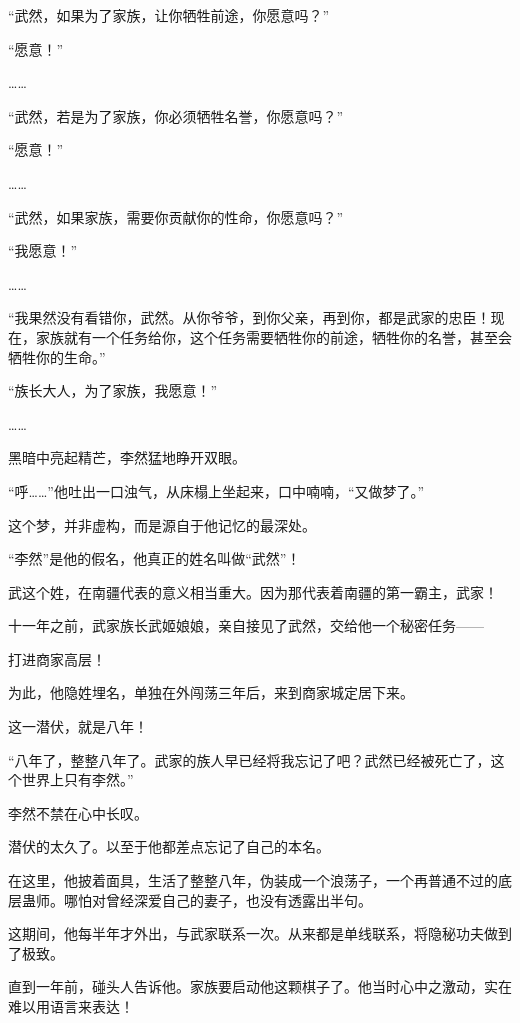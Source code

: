 
\begin{this_body}

“武然，如果为了家族，让你牺牲前途，你愿意吗？”

“愿意！”

……

“武然，若是为了家族，你必须牺牲名誉，你愿意吗？”

“愿意！”

……

“武然，如果家族，需要你贡献你的性命，你愿意吗？”

“我愿意！”

……

“我果然没有看错你，武然。从你爷爷，到你父亲，再到你，都是武家的忠臣！现在，家族就有一个任务给你，这个任务需要牺牲你的前途，牺牲你的名誉，甚至会牺牲你的生命。”

“族长大人，为了家族，我愿意！”

……

黑暗中亮起精芒，李然猛地睁开双眼。

“呼……”他吐出一口浊气，从床榻上坐起来，口中喃喃，“又做梦了。”

这个梦，并非虚构，而是源自于他记忆的最深处。

“李然”是他的假名，他真正的姓名叫做“武然”！

武这个姓，在南疆代表的意义相当重大。因为那代表着南疆的第一霸主，武家！

十一年之前，武家族长武姬娘娘，亲自接见了武然，交给他一个秘密任务——

打进商家高层！

为此，他隐姓埋名，单独在外闯荡三年后，来到商家城定居下来。

这一潜伏，就是八年！

“八年了，整整八年了。武家的族人早已经将我忘记了吧？武然已经被死亡了，这个世界上只有李然。”

李然不禁在心中长叹。

潜伏的太久了。以至于他都差点忘记了自己的本名。

在这里，他披着面具，生活了整整八年，伪装成一个浪荡子，一个再普通不过的底层蛊师。哪怕对曾经深爱自己的妻子，也没有透露出半句。

这期间，他每半年才外出，与武家联系一次。从来都是单线联系，将隐秘功夫做到了极致。

直到一年前，碰头人告诉他。家族要启动他这颗棋子了。他当时心中之激动，实在难以用语言来表达！


\end{this_body}
